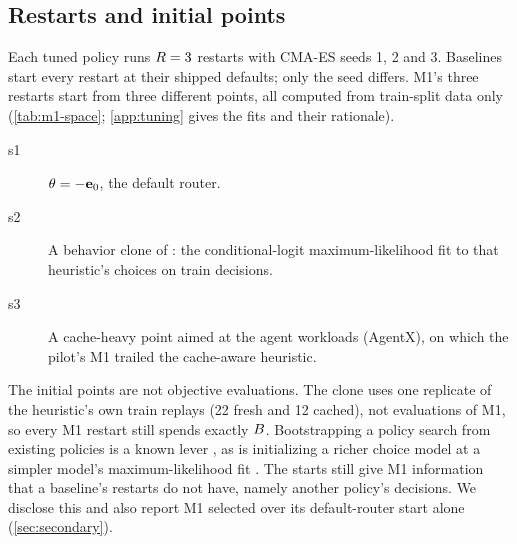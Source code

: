 \subsection{Restarts and initial points}
\label{sec:restarts}

Each tuned policy runs $R = 3$ restarts with CMA-ES seeds 1, 2 and 3. Baselines start
every restart at their shipped defaults; only the seed differs. M1's three restarts start from
three different points, all computed from train-split data only (\cref{tab:m1-space};
\cref{app:tuning} gives the fits and their rationale).
\begin{description}
  \item[s1] $\theta = -\mathbf{e}_{0}$, the default router.
  \item[s2] A behavior clone of : the conditional-logit
    maximum-likelihood fit to that heuristic's choices on train decisions.
  \item[s3] A cache-heavy point aimed at the agent workloads (AgentX), on which the pilot's M1
    trailed the cache-aware heuristic.
\end{description}

The initial points are not objective evaluations. The clone uses one replicate of the heuristic's
own train replays (22 fresh and 12 cached), not evaluations of M1, so every M1 restart still spends
exactly $B$. Bootstrapping a policy search from existing policies is a known lever
\citep{mao2019park}, as is initializing a richer choice model at a simpler model's maximum-likelihood
fit \citep{seshadri2019cdm}. The starts still give M1 information that a baseline's restarts do
not have, namely another policy's decisions. We disclose this and also report M1 selected over its
default-router start alone (\cref{sec:secondary}).

